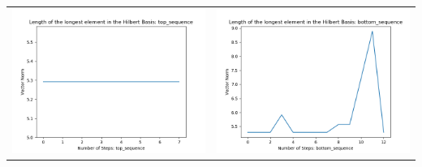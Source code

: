 \documentclass[10pt]{article}
\begin{document}
\begin{tabular}{c|c}
\begin{minipage}{.45\textwidth}
\includegraphics[width=\textwidth]{"DATA/5d/6 generators 2 bound J/top_sequence LENGTH"}
\end{minipage} &
\begin{minipage}{.45\textwidth}
\includegraphics[width=\textwidth]{"DATA/5d/6 generators 2 bound J bottomup/bottom_sequence LENGTH"}
\end{minipage}
\end{tabular}
\end{document}
